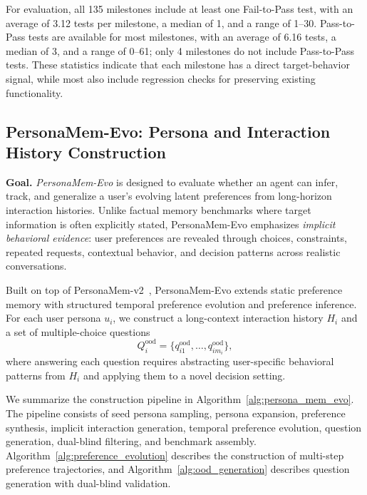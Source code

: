 \documentclass{llmxive}
\begin{document}
For evaluation, all 135 milestones include at least one Fail-to-Pass test, with an average of 3.12 tests per milestone, a median of 1, and a range of 1--30. Pass-to-Pass tests are available for most milestones, with an average of 6.16 tests, a median of 3, and a range of 0--61; only 4 milestones do not include Pass-to-Pass tests. These statistics indicate that each milestone has a direct target-behavior signal, while most also include regression checks for preserving existing functionality.













\subsection{PersonaMem-Evo: Persona and Interaction History Construction}
\label{sec:persona_mem_evo_construction}
\label{app:persona_history}

\textbf{Goal.}
\emph{PersonaMem-Evo} is designed to evaluate whether an agent can infer, track, and generalize a user's evolving latent preferences from long-horizon interaction histories. Unlike factual memory benchmarks where target information is often explicitly stated, PersonaMem-Evo emphasizes \emph{implicit behavioral evidence}: user preferences are revealed through choices, constraints, repeated requests, contextual behavior, and decision patterns across realistic conversations.

Built on top of PersonaMem-v2~\cite{jiang2025personamem}, PersonaMem-Evo extends static preference memory with structured temporal preference evolution and preference inference. For each user persona $u_i$, we construct a long-context interaction history $H_i$ and a set of multiple-choice questions
\[
Q_i^{\mathrm{ood}} = \{q_{i1}^{\mathrm{ood}}, \ldots, q_{im_i}^{\mathrm{ood}}\},
\]
where answering each question requires abstracting user-specific behavioral patterns from $H_i$ and applying them to a novel decision setting.

We summarize the construction pipeline in Algorithm~\ref{alg:persona_mem_evo}. The pipeline consists of seed persona sampling, persona expansion, preference synthesis, implicit interaction generation, temporal preference evolution, question generation, dual-blind filtering, and benchmark assembly. Algorithm~\ref{alg:preference_evolution} describes the construction of multi-step preference trajectories, and Algorithm~\ref{alg:ood_generation} describes question generation with dual-blind validation.
\end{document}
